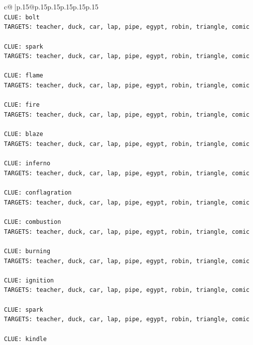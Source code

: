 \documentclass{article}
\begin{document}
{\begin{supertabular}{c@{$\;$}|p{.15\linewidth}@{}p{.15\linewidth}p{.15\linewidth}p{.15\linewidth}p{.15\linewidth}p{.15\linewidth}}
{{{\\ 
\texttt{CLUE: bolt} \\
\texttt{TARGETS: teacher, duck, car, lap, pipe, egypt, robin, triangle, comic} \\
\\ 
\texttt{CLUE: spark} \\
\texttt{TARGETS: teacher, duck, car, lap, pipe, egypt, robin, triangle, comic} \\
\\ 
\texttt{CLUE: flame} \\
\texttt{TARGETS: teacher, duck, car, lap, pipe, egypt, robin, triangle, comic} \\
\\ 
\texttt{CLUE: fire} \\
\texttt{TARGETS: teacher, duck, car, lap, pipe, egypt, robin, triangle, comic} \\
\\ 
\texttt{CLUE: blaze} \\
\texttt{TARGETS: teacher, duck, car, lap, pipe, egypt, robin, triangle, comic} \\
\\ 
\texttt{CLUE: inferno} \\
\texttt{TARGETS: teacher, duck, car, lap, pipe, egypt, robin, triangle, comic} \\
\\ 
\texttt{CLUE: conflagration} \\
\texttt{TARGETS: teacher, duck, car, lap, pipe, egypt, robin, triangle, comic} \\
\\ 
\texttt{CLUE: combustion} \\
\texttt{TARGETS: teacher, duck, car, lap, pipe, egypt, robin, triangle, comic} \\
\\ 
\texttt{CLUE: burning} \\
\texttt{TARGETS: teacher, duck, car, lap, pipe, egypt, robin, triangle, comic} \\
\\ 
\texttt{CLUE: ignition} \\
\texttt{TARGETS: teacher, duck, car, lap, pipe, egypt, robin, triangle, comic} \\
\\ 
\texttt{CLUE: spark} \\
\texttt{TARGETS: teacher, duck, car, lap, pipe, egypt, robin, triangle, comic} \\
\\ 
\texttt{CLUE: kindle} \\
}}}
\end{supertabular}}
\end{document}
